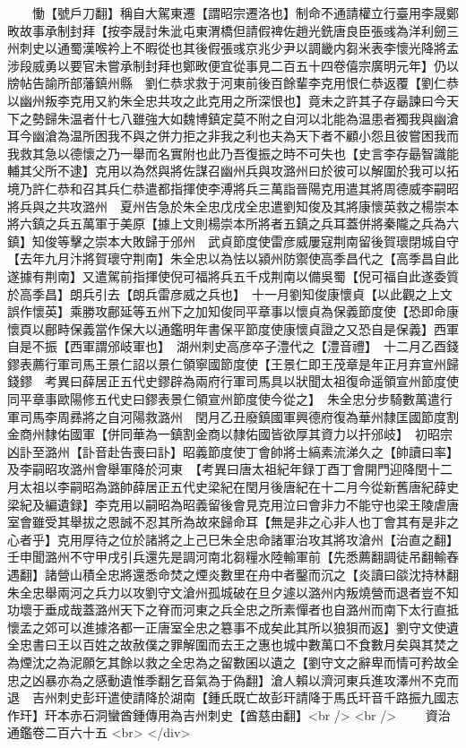 　　慟【號戶刀翻】稱自大駕東遷【謂昭宗遷洛也】制命不通請權立行臺用李晟鄭畋故事承制封拜【按李晟討朱泚屯東渭橋但請假禆佐趙光銑唐良臣張彧為洋利劒三州刺史以通蜀漢喉衿上不暇從也其後假張彧京兆少尹以調畿内芻米表李懷光降將孟涉段威勇以要官未嘗承制封拜也鄭畋便宜從事見二百五十四卷僖宗廣明元年】仍以牓帖告諭所部藩鎮州縣　劉仁恭求救于河東前後百餘輩李克用恨仁恭返覆【劉仁恭以幽州叛李克用又約朱全忠共攻之此克用之所深恨也】竟未之許其子存朂諫曰今天下之勢歸朱温者什七八雖強大如魏博鎮定莫不附之自河以北能為温患者獨我與幽滄耳今幽滄為温所困我不與之併力拒之非我之利也夫為天下者不顧小怨且彼嘗困我而我救其急以德懷之乃一舉而名實附也此乃吾復振之時不可失也【史言李存朂智識能輔其父所不逮】克用以為然與將佐謀召幽州兵與攻潞州曰於彼可以解圍於我可以拓境乃許仁恭和召其兵仁恭遣都指揮使李溥將兵三萬詣晉陽克用遣其將周德威李嗣昭將兵與之共攻潞州　夏州告急於朱全忠戊戌全忠遣劉知俊及其將康懷英救之楊崇本將六鎮之兵五萬軍于美原【據上文則楊崇本所將者五鎮之兵耳蓋併將秦隴之兵為六鎮】知俊等擊之崇本大敗歸于邠州　武貞節度使雷彦威屢寇荆南留後賀瓌閉城自守【去年九月汴將賀瓌守荆南】朱全忠以為怯以潁州防禦使高季昌代之【高季昌自此遂據有荆南】又遣駕前指揮使倪可福將兵五千戍荆南以備吳蜀【倪可福自此遂委質於高季昌】朗兵引去【朗兵雷彦威之兵也】　十一月劉知俊康懷貞【以此觀之上文誤作懷英】乘勝攻鄜延等五州下之加知俊同平章事以懷貞為保義節度使【恐即命康懷頁以鄜畤保義當作保大以通鑑明年書保平節度使康懷貞證之又恐自是保義】西軍自是不振【西軍謂邠岐軍也】　湖州刺史高彦卒子澧代之【澧音禮】　十二月乙酉錢鏐表薦行軍司馬王景仁詔以景仁領寧國節度使【王景仁即王茂章是年正月弃宣州歸錢鏐　考異曰薛居正五代史鏐辟為兩府行軍司馬具以狀聞太祖復命遥領宣州節度使同平章事歐陽修五代史曰鏐表景仁領宣州節度使今從之】　朱全忠分步騎數萬遣行軍司馬李周彞將之自河陽救潞州　閏月乙丑廢鎮國軍興德府復為華州隸匡國節度割金商州隸佑國軍【併同華為一鎮割金商以隸佑國皆欲厚其資力以扞邠岐】　初昭宗凶訃至潞州【訃音赴告喪曰訃】昭義節度使丁會帥將士縞素流涕久之【帥讀曰率】及李嗣昭攻潞州會舉軍降於河東　【考異曰唐太祖紀年録丁酉丁會開門迎降閏十二月太祖以李嗣昭為潞帥薛居正五代史梁紀在閏月後唐紀在十二月今從新舊唐紀薛史梁紀及編遺録】李克用以嗣昭為昭義留後會見克用泣曰會非力不能守也梁王陵虐唐室會雖受其舉拔之恩誠不忍其所為故來歸命耳【無是非之心非人也丁會其有是非之心者乎】克用厚待之位於諸將之上己巳朱全忠命諸軍治攻其將攻滄州【治直之翻】壬申聞潞州不守甲戌引兵還先是調河南北芻糧水陸輸軍前【先悉薦翻調徒吊翻輸舂遇翻】諸營山積全忠將還悉命焚之煙炎數里在舟中者鑿而沉之【炎讀曰燄沈持林翻朱全忠舉兩河之兵力以攻劉守文滄州孤城破在旦夕遽以潞州内叛燒營而退者豈不知功壞于垂成哉蓋潞州天下之脊而河東之兵全忠之所素憚者也自潞州而南下太行直抵懷孟之郊可以進據洛都一正唐室全忠之簒事不成矣此其所以狼狽而返】劉守文使遺全忠書曰王以百姓之故赦僕之罪解圍而去王之惠也城中數萬口不食數月矣與其焚之為煙沈之為泥願乞其餘以救之全忠為之留數囷以遺之【劉守文之辭卑而情可矜故全忠之凶暴亦為之感動遺惟季翻乞音氣為于偽翻】滄人賴以濟河東兵進攻澤州不克而退　吉州刺史彭玕遣使請降於湖南【鍾氏既亡故彭玕請降于馬氏玕音千路振九國志作玕】玕本赤石洞蠻酋鍾傳用為吉州刺史【酋慈由翻】<br />
<br />
　　資治通鑑卷二百六十五  <br>
   </div> 


